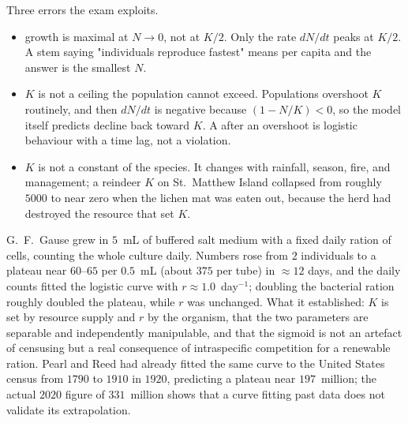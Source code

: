 \begin{warnbox}[title={TRAP: what is maximal at $K/2$, and what $K$ is not}]
Three errors the exam exploits.
\begin{itemize}
\item {} growth is maximal at $N\rightarrow 0$, not at $K/2$. Only
the  rate $dN/dt$ peaks at $K/2$. A stem saying "individuals
reproduce fastest" means per capita and the answer is the smallest $N$.
\item $K$ is not a ceiling the population cannot exceed. Populations overshoot
$K$ routinely, and then $dN/dt$ is negative because $(1-N/K)<0$, so the model
itself predicts decline back toward $K$. A  after an overshoot is
logistic behaviour with a time lag, not a violation.
\item $K$ is not a constant of the species. It changes with rainfall, season,
fire, and management; a reindeer $K$ on St.~Matthew Island collapsed from
roughly $5000$ to near zero when the lichen mat was eaten out, because the herd
had destroyed the resource that set $K$.
\end{itemize}
\end{warnbox}

\begin{expbox}[title={EXPERIMENT: Gause's \sn{Paramecium} cultures, 1934}]
G.~F.~Gause grew  in $5$~mL of buffered salt medium with a
fixed daily ration of  cells, counting the whole culture daily.
Numbers rose from $2$ individuals to a plateau near $60$--$65$ per $0.5$~mL
(about $375$ per tube) in $\approx 12$ days, and the daily counts fitted the
logistic curve with $r\approx 1.0$~day$^{-1}$; doubling the bacterial ration
roughly doubled the plateau, while $r$ was unchanged. What it established: $K$
is set by resource supply and $r$ by the organism, that the two parameters are
separable and independently manipulable, and that the sigmoid is not an artefact
of censusing but a real consequence of intraspecific competition for a renewable
ration. Pearl and Reed had already fitted the same curve to the United States
census from $1790$ to $1910$ in $1920$, predicting a plateau near
$197$~million; the actual $2020$ figure of $331$~million shows that a curve
fitting past data does not validate its extrapolation.
\end{expbox}


